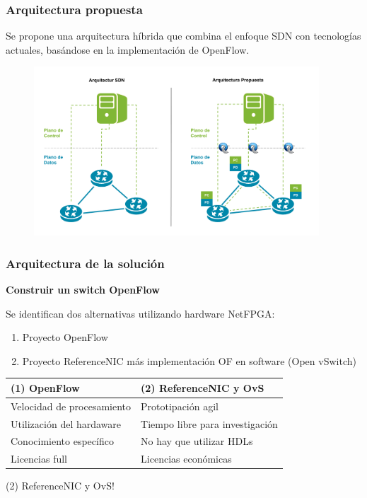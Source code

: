 \documentclass{beamer}
\begin{document}
\begin{frame}
\frametitle{Arquitectura propuesta} 

Se propone una arquitectura h\'ibrida que combina el enfoque SDN con tecnologías actuales, basándose 
en la implementaci\'on de OpenFlow.

\begin{figure}[H]
\centering
\includegraphics[width=0.95\textwidth, left]{imagenes/arquitecturapropuesta.png}
\end{figure}

\end{frame}


\begin{frame}
\frametitle{Arquitectura de la soluci\'on} 

\textbf{Construir un switch OpenFlow} 

\vspace{0.3cm}
Se identifican dos alternativas utilizando hardware NetFPGA:
\pause 
\begin{enumerate}
\item Proyecto OpenFlow
\pause
\item Proyecto ReferenceNIC m\'as implementaci\'on OF en software (Open vSwitch)
\end{enumerate}

\pause
\begin{table}[]
\small
\centering
\label{label}
\begin{tabular}{| p{5cm} | p{5cm} |}

\hline
\multicolumn{1}{|l|}{(1) OpenFlow } & \multicolumn{1}{l|}{(2) ReferenceNIC y OvS } \\
\hline
Velocidad de procesamiento & Prototipaci\'on agil \\
Utilizaci\'on del hardaware &  Tiempo libre para investigaci\'on \\
Conocimiento espec\'ifico &  No hay que utilizar HDLs \\
Licencias full &  Licencias econ\'omicas \\

\hline  
\end{tabular}
\end{table}

\pause
{\color{blue} (2) ReferenceNIC y OvS!}

\end{frame}
\end{document}
